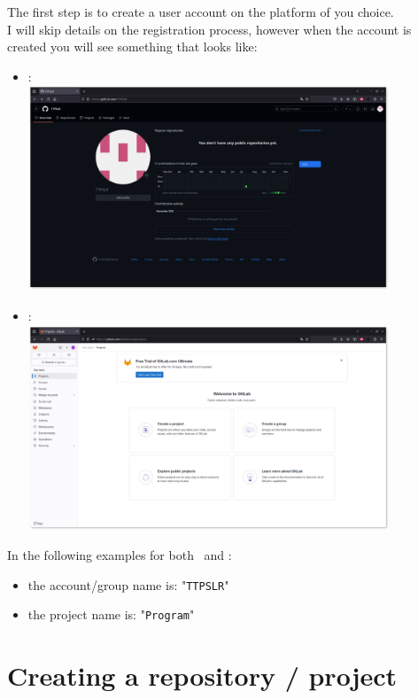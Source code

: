 The first step is to create a user account on the platform of you choice. \\
I will skip details on the registration process, however when the account is created you will see something that looks like:
\begin{itemize}
\item \github: \\[0.25cm]
\includegraphics[width=0.85\textwidth,keepaspectratio=true,draft=\ddst]{img/hosts/github/home.eps}
\item \gitlab: \\[0.25cm]
\includegraphics[width=0.85\textwidth,keepaspectratio=true,draft=\ddst]{img/hosts/gitlab/home.eps}
\end{itemize}
In the following examples for both \github\ and \gitlab:
\begin{itemize}
\item the account/group name is: "\texttt{TTPSLR}"
\item the project name is: "\texttt{Program}"
\end{itemize}

\newpage
\section{Creating a repository / project}


